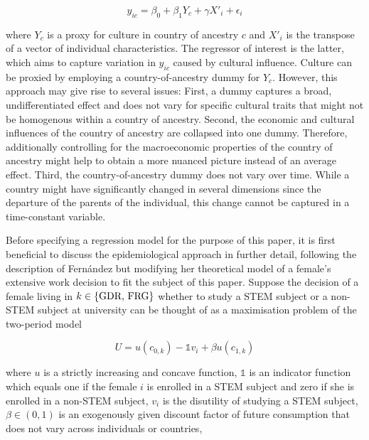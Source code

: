 \documentclass[a4paper, oneside, hyperfootnotes = false]{article}
\begin{document}
{\vspace{-8mm}

\begin{equation}
	\label{eq:fernandezexercise}
	y_{ic} = \beta_{0} + \beta_{1}Y_{c} + \gamma{}X'_{i} + \epsilon_{i}
\end{equation}

\noindent where $Y_{c}$ is a proxy for culture in country of ancestry $c$ and $X'_{i}$ is the transpose of a vector of individual characteristics.
The regressor of interest is the latter, which aims to capture variation in $y_{ic}$ caused by cultural influence.
Culture can be proxied by employing a country-of-ancestry dummy for $Y_{c}$.
However, this approach may give rise to several issues:
First, a dummy captures a broad, undifferentiated effect and does not vary for specific cultural traits that might not be homogenous within a country of ancestry.
Second, the economic and cultural influences of the country of ancestry are collapsed into one dummy.
Therefore, additionally controlling for the macroeconomic properties of the country of ancestry might help to obtain a more nuanced picture instead of an average effect.
Third, the country-of-ancestry dummy does not vary over time.
While a country might have significantly changed in several dimensions since the departure of the parents of the individual, this change cannot be captured in a time-constant variable.

Before specifying a regression model for the purpose of this paper, it is first  beneficial to discuss the epidemiological approach in further detail, following the description of Fernández but modifying her theoretical model of a female's extensive work decision to fit the subject of this paper.
Suppose the decision of a female living in $k \in \{\textnormal{GDR, FRG}\}$ whether to study a STEM subject or a non-STEM subject at university can be thought of as a maximisation problem of the two-period model

\vspace{-8mm}

\begin{equation}
	\label{eq:utility}
	U = u(c_{0,k}) - \mathds{1}v_{i} + \beta{}u(c_{1,k})
\end{equation}

\noindent where $u$ is a strictly increasing and concave function, $\mathds{1}$ is an indicator function which equals one if the female $i$ is enrolled in a STEM subject and zero if she is enrolled in a non-STEM subject, $v_{i}$ is the disutility of studying a STEM subject, $\beta \in (0,1)$ is an exogenously given discount factor of future consumption that does not vary across individuals or countries,

}
\end{document}
